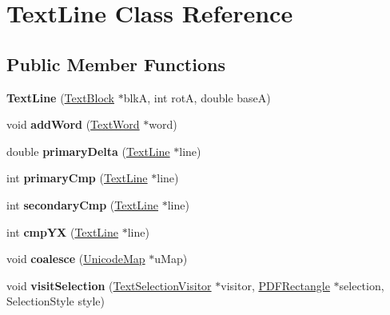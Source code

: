 \hypertarget{class_text_line}{}\section{Text\+Line Class Reference}
\label{class_text_line}
\subsection*{Public Member Functions}
\begin{DoxyCompactItemize}
\item 
\mbox{\label{class_text_line_ad25e5da87c04e6bd584531b811e690ef}} 
{\bfseries Text\+Line} (\hyperlink{class_text_block}{Text\+Block} $\ast$blkA, int rotA, double baseA)
\item 
\mbox{\label{class_text_line_a86e9cc5107b30131b4b894df41508301}} 
void {\bfseries add\+Word} (\hyperlink{class_text_word}{Text\+Word} $\ast$word)
\item 
\mbox{\label{class_text_line_a9d19f19d0e9240e9a48ef44faaf6796e}} 
double {\bfseries primary\+Delta} (\hyperlink{class_text_line}{Text\+Line} $\ast$line)
\item 
\mbox{\label{class_text_line_abac513e2aef27aa50f4548a979d97948}} 
int {\bfseries primary\+Cmp} (\hyperlink{class_text_line}{Text\+Line} $\ast$line)
\item 
\mbox{\label{class_text_line_a2ca9d25cd9689fb2e185a59435d3e36f}} 
int {\bfseries secondary\+Cmp} (\hyperlink{class_text_line}{Text\+Line} $\ast$line)
\item 
\mbox{\label{class_text_line_a9f03e15a3d005506da710b8a7afefd8f}} 
int {\bfseries cmp\+YX} (\hyperlink{class_text_line}{Text\+Line} $\ast$line)
\item 
\mbox{\label{class_text_line_aabda0415c0acbe71b401fd0909d03a9c}} 
void {\bfseries coalesce} (\hyperlink{class_unicode_map}{Unicode\+Map} $\ast$u\+Map)
\item 
\mbox{\label{class_text_line_a7e37fc149d29457769ce0d080297ddb6}} 
void {\bfseries visit\+Selection} (\hyperlink{class_text_selection_visitor}{Text\+Selection\+Visitor} $\ast$visitor, \hyperlink{class_p_d_f_rectangle}{P\+D\+F\+Rectangle} $\ast$selection, Selection\+Style style)

\end{DoxyCompactItemize}
